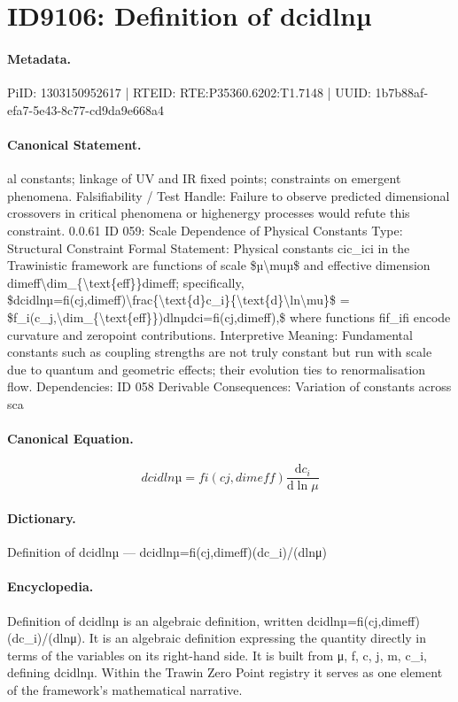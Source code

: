 \section*{ID9106: Definition of dcidlnµ}
\paragraph{Metadata.}
PiID: 1303150952617 | RTEID: RTE:P35360.6202:T1.7148 | UUID: 1b7b88af-efa7-5e43-8c77-cd9da9e668a4

\paragraph{Canonical Statement.}
al constants; linkage of UV and IR fixed points; constraints on emergent phenomena. Falsifiability / Test Handle: Failure to observe predicted dimensional crossovers in critical phenomena or highenergy processes would refute this constraint. 0.0.61 ID 059: Scale Dependence of Physical Constants Type: Structural Constraint Formal Statement: Physical constants cic\_ici in the Trawinistic framework are functions of scale \$µ\textbackslash{}muµ\$ and effective dimension dimeff\textbackslash{}dim\_\{\textbackslash{}text\{eff\}\}dimeff; specifically, \$dcidlnµ=fi(cj,dimeff)\textbackslash{}frac\{\textbackslash{}text\{d\}c\_i\}\{\textbackslash{}text\{d\}\textbackslash{}ln\textbackslash{}mu\}\$ = \$f\_i(c\_j,\textbackslash{}dim\_\{\textbackslash{}text\{eff\}\})dlnµdci=fi(cj,dimeff),\$ where functions fif\_ifi encode curvature and zeropoint contributions. Interpretive Meaning: Fundamental constants such as coupling strengths are not truly constant but run with scale due to quantum and geometric effects; their evolution ties to renormalisation flow. Dependencies: ID 058 Derivable Consequences: Variation of constants across sca

\paragraph{Canonical Equation.}
\[
dcidlnµ=fi(cj,dimeff)\frac{\text{d}c_i}{\text{d}\ln\mu}
\]

\paragraph{Dictionary.}
Definition of dcidlnµ — dcidlnµ=fi(cj,dimeff)(dc\_i)/(dlnμ)

\paragraph{Encyclopedia.}
Definition of dcidlnµ is an algebraic definition, written dcidlnµ=fi(cj,dimeff)(dc\_i)/(dlnμ). It is an algebraic definition expressing the quantity directly in terms of the variables on its right-hand side. It is built from μ, f, c, j, m, c\_i, defining dcidlnµ. Within the Trawin Zero Point registry it serves as one element of the framework's mathematical narrative.
